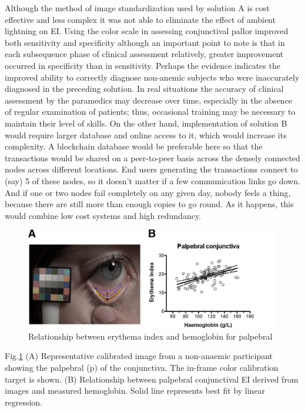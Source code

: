 \documentclass[peerreview]{IEEEtran}
\begin{document}
Although the method of image standardization used by solution A is cost effective and less complex it was not able 
to eliminate the effect of ambient lightning on EI. Using the color scale in assessing conjunctival pallor improved 
both sensitivity and specificity although an important point to note is that in each subsequence phase of clinical
assessment relatively, greater improvement occurred in specificity than in sensitivity. Perhaps the evidence indicates
the improved ability to correctly diagnose non-anemic subjects who were inaccurately diagnosed in the preceding solution.
 In real situations the accuracy of clinical assessment by the paramedics may decrease over time, especially in the absence 
 of regular examination of patients; thus, occasional training may be necessary to maintain their level of skills.
On the other hand, implementation of solution B would require larger database and online access to it, which would increase 
its complexity. A blockchain database would be preferable here so that the transactions would be shared
on a peer-to-peer basis across the densely connected nodes across different locations. End users generating the transactions 
connect to (say) 5 of these nodes, so it doesn’t matter if a few communication links go down. And if one or two nodes fail 
completely on any given day, nobody feels a thing, because there are still more than enough copies to go round. As it 
happens, this would combine low cost systems and high redundancy. 

\begin{figure}[htp]
 \centering
 \includegraphics[width=\linewidth]{img.png}
 \caption{Relationship between erythema index and hemoglobin for palpebral}
 \label{fig:0}
\end{figure}


Fig.\ref{fig:0} (A) Representative calibrated image from a non-anaemic participant showing the palpebral (p) of the conjunctiva. 
The in-frame color calibration target is shown. (B) Relationship between palpebral conjunctival EI derived from images and 
measured hemoglobin. Solid line represents best fit by linear regression.
\end{document}
